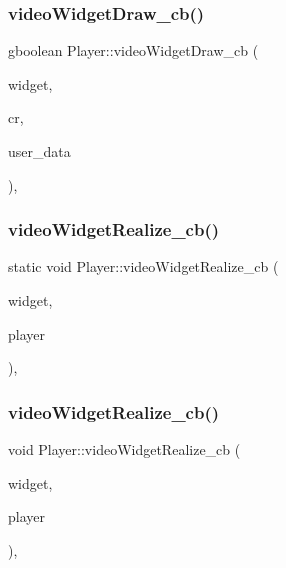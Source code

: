 \subsubsection{\texorpdfstring{video\+Widget\+Draw\+\_\+cb()}{videoWidgetDraw\_cb()}\hspace{0.1cm}{\footnotesize\ttfamily [2/2]}}
{\footnotesize\ttfamily gboolean Player\+::video\+Widget\+Draw\+\_\+cb (\begin{DoxyParamCaption}\item[{Gtk\+Widget $\ast$}]{widget,  }\item[{cairo\+\_\+t $\ast$}]{cr,  }\item[{gpointer}]{user\+\_\+data }\end{DoxyParamCaption})\hspace{0.3cm}{\ttfamily [static]}, {\ttfamily [private]}}

\mbox{\label{class_player_a6a18c90131b03493e506d50d16925436}} 
\subsubsection{\texorpdfstring{video\+Widget\+Realize\+\_\+cb()}{videoWidgetRealize\_cb()}\hspace{0.1cm}{\footnotesize\ttfamily [1/2]}}
{\footnotesize\ttfamily static void Player\+::video\+Widget\+Realize\+\_\+cb (\begin{DoxyParamCaption}\item[{Gtk\+Widget $\ast$}]{widget,  }\item[{\hyperlink{class_player}{Player} $\ast$}]{player }\end{DoxyParamCaption})\hspace{0.3cm}{\ttfamily [static]}, {\ttfamily [private]}}

\mbox{\label{class_player_aeb024ba54089ecaf90753a6f6b8d07bc}} 
\subsubsection{\texorpdfstring{video\+Widget\+Realize\+\_\+cb()}{videoWidgetRealize\_cb()}\hspace{0.1cm}{\footnotesize\ttfamily [2/2]}}
{\footnotesize\ttfamily void Player\+::video\+Widget\+Realize\+\_\+cb (\begin{DoxyParamCaption}\item[{Gtk\+Widget $\ast$}]{widget,  }\item[{\hyperlink{class_player}{Player} $\ast$}]{player }\end{DoxyParamCaption})\hspace{0.3cm}{\ttfamily [static]}, {\ttfamily [private]}}



